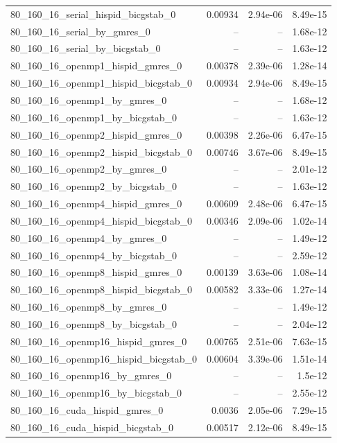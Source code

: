 \documentclass[11pt]{article}
\begin{document}
\begin{longtable}{lrrr}
80\_160\_16\_serial\_hispid\_bicgstab\_0 & 0.00934 & 2.94e-06 & 8.49e-15\\
80\_160\_16\_serial\_by\_gmres\_0 & -- & -- & 1.68e-12\\
80\_160\_16\_serial\_by\_bicgstab\_0 & -- & -- & 1.63e-12\\
80\_160\_16\_openmp1\_hispid\_gmres\_0 & 0.00378 & 2.39e-06 & 1.28e-14\\
80\_160\_16\_openmp1\_hispid\_bicgstab\_0 & 0.00934 & 2.94e-06 & 8.49e-15\\
80\_160\_16\_openmp1\_by\_gmres\_0 & -- & -- & 1.68e-12\\
80\_160\_16\_openmp1\_by\_bicgstab\_0 & -- & -- & 1.63e-12\\
80\_160\_16\_openmp2\_hispid\_gmres\_0 & 0.00398 & 2.26e-06 & 6.47e-15\\
80\_160\_16\_openmp2\_hispid\_bicgstab\_0 & 0.00746 & 3.67e-06 & 8.49e-15\\
80\_160\_16\_openmp2\_by\_gmres\_0 & -- & -- & 2.01e-12\\
80\_160\_16\_openmp2\_by\_bicgstab\_0 & -- & -- & 1.63e-12\\
80\_160\_16\_openmp4\_hispid\_gmres\_0 & 0.00609 & 2.48e-06 & 6.47e-15\\
80\_160\_16\_openmp4\_hispid\_bicgstab\_0 & 0.00346 & 2.09e-06 & 1.02e-14\\
80\_160\_16\_openmp4\_by\_gmres\_0 & -- & -- & 1.49e-12\\
80\_160\_16\_openmp4\_by\_bicgstab\_0 & -- & -- & 2.59e-12\\
80\_160\_16\_openmp8\_hispid\_gmres\_0 & 0.00139 & 3.63e-06 & 1.08e-14\\
80\_160\_16\_openmp8\_hispid\_bicgstab\_0 & 0.00582 & 3.33e-06 & 1.27e-14\\
80\_160\_16\_openmp8\_by\_gmres\_0 & -- & -- & 1.49e-12\\
80\_160\_16\_openmp8\_by\_bicgstab\_0 & -- & -- & 2.04e-12\\
80\_160\_16\_openmp16\_hispid\_gmres\_0 & 0.00765 & 2.51e-06 & 7.63e-15\\
80\_160\_16\_openmp16\_hispid\_bicgstab\_0 & 0.00604 & 3.39e-06 & 1.51e-14\\
80\_160\_16\_openmp16\_by\_gmres\_0 & -- & -- & 1.5e-12\\
80\_160\_16\_openmp16\_by\_bicgstab\_0 & -- & -- & 2.55e-12\\
80\_160\_16\_cuda\_hispid\_gmres\_0 & 0.0036 & 2.05e-06 & 7.29e-15\\
80\_160\_16\_cuda\_hispid\_bicgstab\_0 & 0.00517 & 2.12e-06 & 8.49e-15\\

\end{longtable}
\end{document}
